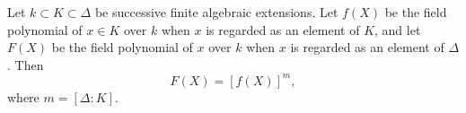 Let $k \subset K \subset \Delta$ be successive finite algebraic extensions. Let $f(X)$ be the field polynomial of $x \in K$ over $k$ when $x$ is regarded as an element of $K$, and let $F(X)$ be the field polynomial of $x$ over $k$ when $x$ is regarded as an element of $\Delta$. Then
$$F(X) = [f(X)]^m,$$
where $m = [\Delta : K]$.
